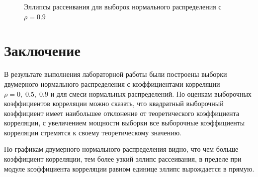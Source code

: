 \documentclass[12pt]{article}
\begin{document}
\begin{flushleft}
\begin{figure}[h!]
\begin{minipage}[h]{0.325\linewidth}
            \end{minipage}
            \begin{minipage}[h]{0.325\linewidth}
            \end{minipage}
            \caption{Эллипсы рассеивания для выборок нормального распределения с $\rho = 0.9$}
            \label{rho_09}
        \end{figure}

\newpage

\section*{Заключение}

        В результате выполнения лабораторной работы были построены выборки двумерного нормального распределения с коэффициентами корреляции $\rho = 0, \; 0.5, \; 0.9$ и для смеси нормальных распределений. По оценкам выборочных коэффициентов корреляции можно сказать, что квадратный выборочный коэффициент имеет наибольшее отклонение от теоретического коэффициента корреляции, с увеличением мощности выборки все выборочные коэффициенты корреляции стремятся к своему теоретическому значению.

        По графикам двумерного нормального распределения видно, что чем больше коэффициент корреляции, тем более узкий эллипс рассеивания, в пределе при модуле коэффициента корреляции равном единице эллипс вырождается в прямую.


\end{flushleft}
\end{document}
